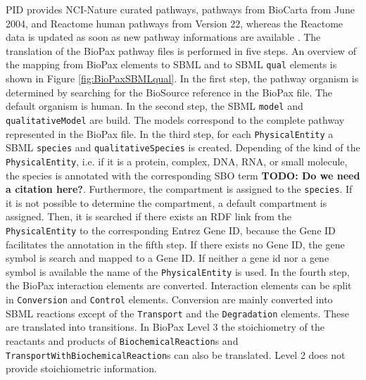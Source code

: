 \documentclass{bioinfo}
\newcommand{\qual}{\texttt{qual}}
\begin{document}
\begin{methods}
PID provides NCI-Nature curated pathways, pathways from BioCarta from June
2004, and Reactome human pathways from Version 22, whereas the Reactome data is updated as soon as new pathway informations are available \citep{Schaefer2009}.
The translation of the BioPax pathway files is performed in five steps.
An overview of the mapping from BioPax elements to SBML and to SBML \qual{} elements is shown in Figure \ref{fig:BioPaxSBMLqual}.
In the first step, the pathway organism is determined by searching for the BioSource reference in the BioPax file.
The default organism is human.
In the second step, the SBML \texttt{model} and \texttt{qualitativeModel} are build.
The models correspond to the complete pathway represented in the BioPax file.
In the third step, for each \texttt{PhysicalEntity} a SBML \texttt{species} and \texttt{qualitativeSpecies} is created.
Depending of the kind of the \texttt{PhysicalEntity}, i.e. if it is a protein, complex, DNA, RNA, or small molecule, the species is annotated with the corresponding SBO term \textbf{TODO: Do we need a citation here?}.
Furthermore, the compartment is assigned to the \texttt{species}. If it is not possible to determine the compartment, a default compartment is assigned.
Then, it is searched if there exists an RDF link from the \texttt{PhysicalEntity} to the corresponding Entrez Gene ID, because the Gene ID facilitates the annotation in the fifth step.
If there exists no Gene ID, the gene symbol is search and mapped to a Gene ID.
If neither a gene id nor a gene symbol is available the name of the \texttt{PhysicalEntity} is used.
In the fourth step, the BioPax interaction elements are converted.
Interaction elements can be split in \texttt{Conversion} and \texttt{Control} elements.
Conversion are mainly converted into SBML reactions except of the \texttt{Transport} and the \texttt{Degradation} elements.
These are translated into transitions.
In BioPax Level 3 the stoichiometry of the reactants and products of \texttt{BiochemicalReaction}s and \texttt{TransportWithBiochemicalReaction}s can also be translated.
Level 2 does not provide stoichiometric information.


\end{methods}
\end{document}

